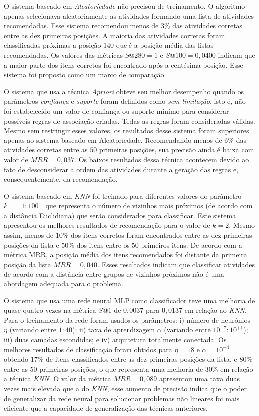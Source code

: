\documentclass[10pt,letterpaper]{article}
\begin{document}
O sistema baseado em \emph{Aleatoriedade} não precisou de treinamento. O algoritmo apenas selecionava aleatoriamente as atividades formando uma lista de atividades recomendadas. Esse sistema recomendou menos de \(3\%\) das atividades corretas entre as dez primeiras posições. A maioria das atividades corretas foram classificadas próximas a posição \(140\) que é a posição média das listas recomendadas. Os valores das métricas \(S@280 = 1\) e \(S@100 = 0,0400\) indicam que a maior parte dos itens corretos foi encontrado após a centésima posição. Esse sistema foi proposto como um marco de comparação.

O sistema que usa a técnica \emph{Apriori} obteve seu melhor desempenho quando os parâmetros \emph{confiança} e \emph{suporte} foram definidos como \emph{sem limitação}, isto é, não foi estabelecido um valor de confiança ou suporte mínimo para considerar possíveis regras de associação criadas. Todas as regras foram consideradas válidas. Mesmo sem restringir esses valores, os resultados desse sistema foram superiores apenas ao sistema baseado em Aleatoriedade. Recomendando menos de \(6\%\) das atividades corretas entre as \(50\) primeiras posições, sua precisão ainda é baixa com valor de \(MRR = 0,037\). Os baixos resultados dessa técnica acontecem devido ao fato de desconsiderar a ordem das atividades durante a geração das regras e, consequentemente, da recomendação.

O sistema baseado em \emph{KNN} foi treinado para diferentes valores do parâmetro \(k = [1:100]\) que representa o número de vizinhos mais próximos (de acordo com a distância Euclidiana) que serão considerados para classificar. Este sistema apresentou os melhores resultados de recomendação para o valor de \(k = 2\). Mesmo assim, menos de \(10\%\) dos itens corretos foram encontrados entre as dez primeiras posições da lista e \(50\%\) dos itens entre os \(50\) primeiros itens. De acordo com a métrica MRR, a posição média dos itens recomendados foi distante da primeira posição da lista \(MRR = 0,040\). Esses resultados indicam que classificar atividades de acordo com a distância entre grupos de vizinhos próximos não é uma abordagem adequada para o problema.

O sistema que usa uma rede neural MLP como classificador teve uma melhoria de quase quatro vezes na métrica \(S@1\) de \(0,0037\) para \(0,0137\) em relação ao \emph{KNN}. Para o treinamento da rede foram usados os parâmetros: i) número de neurônios \(\eta\) (variando entre \(1:40\)); ii) taxa de aprendizagem \(\alpha\) (variando entre \(10^{-7}:10^{+1}\)); iii) duas camadas escondidas; e iv) arquitetura totalmente conectada. Os melhores resultados de classificação foram obtidos para \(\eta = 18\) e \(\alpha = 10^{-4}\) obtendo \(17\%\) de itens classificados entre as dez primeiras posições da lista, e \(80\%\) entre as \(50\) primeiras posições, o que representa uma melhoria de \(30\%\) em relação a técnica \emph{KNN}. O valor da métrica \(MRR = 0,089\) apresentou uma taxa duas vezes mais elevada que a do \emph{KNN}, esse aumento de precisão indica que o poder de generalizar da rede neural para solucionar problemas não lineares foi mais eficiente que a capacidade de generalização das técnicas anteriores.
\end{document}
